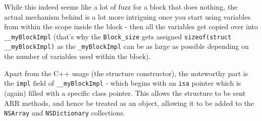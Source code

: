 While this indeed seems like a lot of fuzz for a block that does nothing, the actual mechanism behind is a lot more intriguing once you start using variables from within the scope inside the block - then all the variables get copied over into \verb=__myBlockImpl= (that's why the \verb=Block_size= gets assigned \verb=sizeof(=\verb=struct= \verb=__myBlockImpl)= as the \verb=_myBlockImpl= can be as large as possible depending on the number of variables used within the block).

Apart from the C++ usage (the structure constructor), the noteworthy part is the \verb=impl= field of \verb=__myBlockImpl= - which begins with an \verb=isa= pointer which is (again) filled with a specific class pointer. This allows the structure to be sent ARR methods, and hence be treated as an object, allowing it to be added to the \verb=NSArray= and \verb=NSDictionary= collections.
